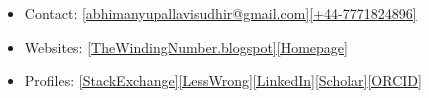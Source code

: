 \documentclass{article}
\begin{document}
\begin{itemize}
    \item Contact:  \href{mailto:abhimanyupallavisudhir@gmail.com}{[abhimanyupallavisudhir@gmail.com]}\href{tel:+44-7771824896}{[+44-7771824896]} %
    \item Websites: \href{https://thewindingnumber.blogspot.com/}{[TheWindingNumber.blogspot]}\href{https://abhimanyu.io/}{[Homepage]}
    \item Profiles: \href{https://math.stackexchange.com/users/78451/abhimanyu-pallavi-sudhir}{[StackExchange]}\href{https://www.lesswrong.com/users/abhimanyu-pallavi-sudhir}{[LessWrong]}\href{https://www.linkedin.com/in/abhimanyu-pallavi-sudhir/}{[LinkedIn]}\href{https://scholar.google.com/citations?user=lb38BjYAAAAJ&hl=en}{[Scholar]}\href{https://orcid.org/my-orcid?orcid=0000-0002-2506-0515}{[ORCID]}
\end{itemize}
\end{document}
